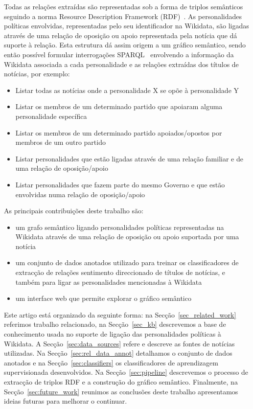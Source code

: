 \documentclass[a4paper, twocolumn, 11pt, twoside]{article}
\begin{document}
Todas as relações extraídas são representadas sob a forma de triplos semânticos seguindo a norma Resource Description Framework (RDF)~\citep{schreiber2014primer}. As personalidades políticas envolvidas, representadas pelo seu identificador na Wikidata, são ligadas através de uma relação de oposição ou apoio representada pela notícia que dá suporte à relação. Esta estrutura dá assim origem a um gráfico semântico, sendo então possível formular interrogações SPARQL~\citep{2013sparql} envolvendo a informação da Wikidata associada a cada personalidade e as relações extraídas dos títulos de notícias, por exemplo:

\begin{itemize}
\item{Listar todas as notícias onde a personalidade X se opõe à personalidade Y}
\item{Listar os membros de um determinado partido que apoiaram alguma personalidade específica}
\item{Listar os membros de um determinado partido apoiados/opostos por membros de um outro partido}
\item{Listar personalidades que estão ligadas através de uma relação familiar e de uma relação de oposição/apoio}
\item{Listar personalidades que fazem parte do mesmo Governo e que estão envolvidas numa relação de oposição/apoio}
\end{itemize}

As principais contribuições deste trabalho são: 

\begin{itemize}
\item{um grafo semântico ligando personalidades políticas representadas na Wikidata através de uma relação de oposição ou apoio suportada por uma notícia}
\item{um conjunto de dados anotados utilizado para treinar os classificadores de extracção de relações sentimento direccionado de títulos de notícias, e também para ligar as personalidades mencionadas à Wikidata}
\item{um interface web que permite explorar o gráfico semântico}
\end{itemize}

Este artigo está organizado da seguinte forma: na Secção~\ref{sec_related_work} referimos trabalho relacionado, na Secção~\ref{sec_kb} descrevemos a base de conhecimento usada no suporte de ligação das personalidades políticas à Wikidata. A Secção~\ref{sec:data_sources} refere e descreve as fontes de notícias utilizadas. Na Secção~\ref{sec:rel_data_annot} detalhamos o conjunto de dados anotados e na Secção~\ref{sec:classifiers} os classificadores de aprendizagem supervisionada desenvolvidos. Na Secção~\ref{sec:pipeline} descrevemos o processo de extracção de triplos RDF e a construção do gráfico semântico. Finalmente, na Secção~\ref{sec:future_work} reunimos as conclusões deste trabalho apresentamos ideias futuras para melhorar o continuar.
\end{document}
